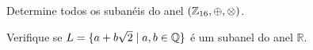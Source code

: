 \documentclass[12pt]{article}
\begin{document}
\vesp

\questao Determine todos os suban\'eis do anel $(\mathbb{Z}_{16}, \oplus, \otimes)$.

\vesp

\questao Verifique se $L = \{ a + b\sqrt{2} \mid a, b \in \mathbb{Q}\}$ {\'e} um subanel
do anel $\mathbb{R}$.

\vesp












\end{document}
